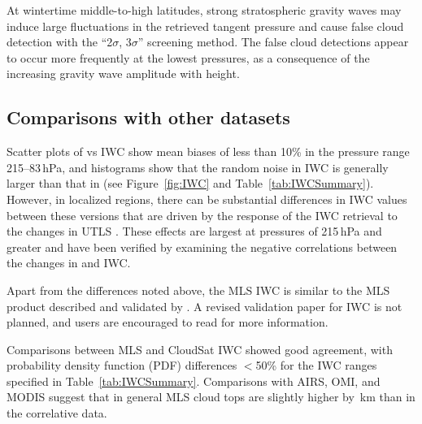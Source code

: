 At wintertime middle-to-high latitudes, strong stratospheric gravity waves may induce large fluctuations in the retrieved tangent pressure and cause false cloud detection with the ``2$\sigma$, 3$\sigma$'' screening method. The false cloud detections appear to occur more frequently at the lowest pressures, as a consequence of the increasing gravity wave amplitude with height.

\subsection{Comparisons with other datasets}

Scatter plots of \thisv vs \vii IWC show mean biases of less than 10\% in the pressure range 215--83\,hPa, and histograms show that the random noise in \thisv IWC is generally larger than that in \vii (see Figure~\ref{fig:IWC} and Table~\ref{tab:IWCSummary}). However, in localized regions, there can be substantial differences in IWC values between these versions that are driven by the response of the IWC retrieval to the changes in \thisv UTLS . These effects are largest at pressures of 215\,hPa and greater and have been verified by examining the negative correlations between the changes in  and IWC.

Apart from the differences noted above, the MLS \thisv IWC is similar to the MLS \vii product described and validated by \citet{WuEtal:2008}. A revised validation paper for IWC is not planned, and users are encouraged to read \citet{WuEtal:2008} for more information.

Comparisons between \vii MLS and CloudSat IWC showed good agreement, with probability density function (PDF) differences $<$50\% for the IWC ranges specified in Table~\ref{tab:IWCSummary}. Comparisons with AIRS, OMI, and MODIS suggest that in general MLS cloud tops are slightly higher by \,km than in the correlative data.

